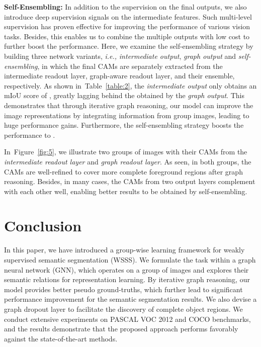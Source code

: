 \documentclass[letterpaper]{article} \usepackage{aaai21}  \usepackage{times}  \usepackage{helvet} \usepackage{courier}  \usepackage[hyphens]{url}  \usepackage{graphicx} \urlstyle{rm} \def\UrlFont{\rm}  \usepackage{graphicx}  \usepackage{natbib}  \usepackage{caption} \frenchspacing  \setlength{\pdfpagewidth}{8.5in}  \setlength{\pdfpageheight}{11in}
\newcommand{\tabref}[1]{Table~\ref{#1}}
\newcommand{\figref}[1]{Figure~\ref{#1}}
\newcommand{\ie}[1]{\textit{i.e.,}}
\begin{document}
\noindent\textbf{Self-Ensembling:}
In addition to the supervision on the final outputs, we also introduce deep supervision signals on the intermediate features. Such multi-level supervision has proven effective for improving the performance of various vision tasks. Besides, this enables us to combine the multiple outputs with low cost to further boost the performance. Here, we examine the self-ensembling strategy by building three network variants, \ie, \textit{intermediate output}, \textit{graph output} and \textit{self-ensembling}, in which the final CAMs are separately extracted from the intermediate readout layer, graph-aware readout layer, and their ensemble, respectively. As shown in~\tabref{table:2}, the \textit{intermediate output} only obtains an mIoU score of , greatly lagging behind the  obtained by the \textit{graph output}. This demonstrates that through iterative graph reasoning, our model can improve the image representations by integrating information from group images, leading to huge performance gains. Furthermore, the self-ensembling strategy boosts the performance to .


In~\figref{fig:5}, we illustrate two groups of images with their CAMs from the \textit{intermediate readout layer} and \textit{graph readout layer}. As seen, in both groups, the CAMs are well-refined to cover more complete foreground regions after graph reasoning. Besides, in many cases, the CAMs from two output layers complement with each other well, enabling better results to be obtained by self-ensembling.


\section{Conclusion}

In this paper, we have introduced a group-wise learning framework for weakly supervised semantic segmentation (WSSS). We formulate the task within a graph neural network (GNN), which operates on a group of images and explores their semantic relations for representation learning. By iterative graph reasoning, our model provides better pseudo ground-truths, which further lead to significant performance improvement for the semantic segmentation results. We also devise a graph dropout layer to facilitate the discovery of complete object regions.
We conduct extensive experiments on PASCAL VOC 2012 and COCO benchmarks, and the results demonstrate that the proposed approach performs favorably against the state-of-the-art methods.






\small
\end{document}
